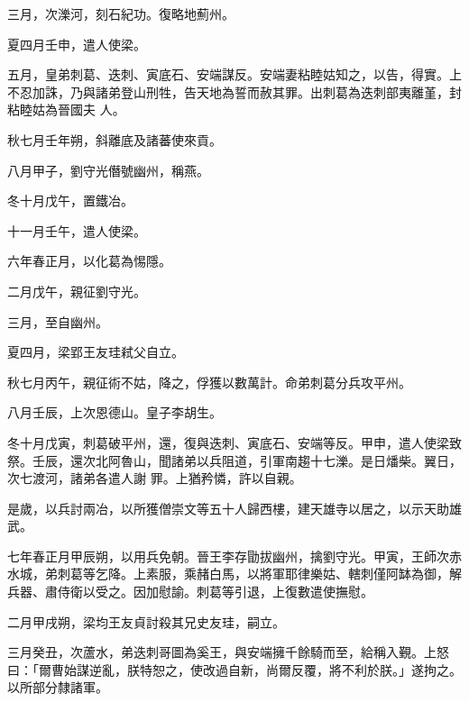 \begin{pinyinscope}
 三月，次濼河，刻石紀功。復略地薊州。



 夏四月壬申，遣人使梁。



 五月，皇弟刺葛、迭刺、寅底石、安端謀反。安端妻粘睦姑知之，以告，得實。上不忍加誅，乃與諸弟登山刑牲，告天地為誓而赦其罪。出刺葛為迭刺部夷離堇，封粘睦姑為晉國夫
 人。



 秋七月壬年朔，斜離底及諸蕃使來貢。



 八月甲子，劉守光僭號幽州，稱燕。



 冬十月戊午，置鐵冶。



 十一月壬午，遣人使梁。



 六年春正月，以化葛為惕隱。



 二月戊午，親征劉守光。



 三月，至自幽州。



 夏四月，梁郢王友珪弒父自立。



 秋七月丙午，親征術不姑，降之，俘獲以數萬計。命弟刺葛分兵攻平州。



 八月壬辰，上次恩德山。皇子李胡生。



 冬十月戊寅，刺葛破平州，還，復與迭刺、寅底石、安端等反。甲申，遣人使梁致祭。壬辰，還次北阿魯山，聞諸弟以兵阻道，引軍南趨十七濼。是日燔柴。翼日，次七渡河，諸弟各遣人謝
 罪。上猶矜憐，許以自親。



 是歲，以兵討兩冶，以所獲僧崇文等五十人歸西樓，建天雄寺以居之，以示天助雄武。



 七年春正月甲辰朔，以用兵免朝。晉王李存勖拔幽州，擒劉守光。甲寅，王師次赤水城，弟刺葛等乞降。上素服，乘赭白馬，以將軍耶律樂姑、轄刺僅阿缽為御，解兵器、肅侍衛以受之。因加慰諭。刺葛等引退，上復數遣使撫慰。



 二月甲戌朔，梁均王友貞討殺其兄史友珪，嗣立。



 三月癸丑，次蘆水，弟迭刺哥圖為奚王，與安端擁千餘騎而至，給稱入覲。上怒曰：「爾曹始謀逆亂，朕特恕之，使改過自新，尚爾反覆，將不利於朕。」遂拘之。以所部分隸諸軍。




\end{pinyinscope}
